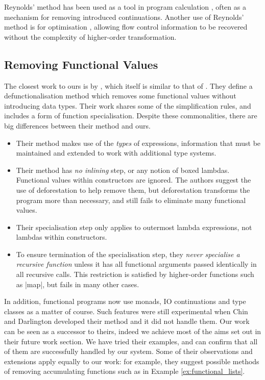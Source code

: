 \documentclass[preprint]{sigplanconf}
\begin{document}
Reynolds' method has been used as a tool in program calculation \cite{danvy:defunctionalization_at_work,hutton:calculating_an_exceptional_machine}, often as a mechanism for removing introduced continuations. Another use of Reynolds' method is for optimisation \cite{jhc}, allowing flow control information to be recovered without the complexity of higher-order transformation.

\subsection{Removing Functional Values}

The closest work to ours is by \citet{chin:higher_order_removal}, which itself is similar to that of \citet{nelan:firstification}. They define a defunctionalisation method which removes some functional values without introducing data types. Their work shares some of the simplification rules, and includes a form of function specialisation. Despite these commonalities, there are big differences between their method and ours.

\begin{itemize}
\item Their method makes use of the \textit{types} of expressions, information that must be maintained and extended to work with additional type systems.
\item Their method has \textit{no inlining} step, or any notion of boxed lambdas. Functional values within constructors are ignored. The authors suggest the use of deforestation \cite{wadler:deforestation} to help remove them, but deforestation transforms the program more than necessary, and still fails to eliminate many functional values.
\item Their specialisation step only applies to outermost lambda expressions, not lambdas within constructors.
\item To ensure termination of the specialisation step, they \textit{never specialise a recursive function} unless it has all functional arguments passed identically in all recursive calls. This restriction is satisfied by higher-order functions such as |map|, but fails in many other cases.
\end{itemize}

In addition, functional programs now use monads, IO continuations and type classes as a matter of course. Such features were still experimental when Chin and Darlington developed their method and it did not handle them. Our work can be seen as a successor to theirs, indeed we achieve most of the aims set out in their future work section. We have tried their examples, and can confirm that all of them are successfully handled by our system. Some of their observations and extensions apply equally to our work: for example, they suggest possible methods of removing accumulating functions such as in Example \ref{ex:functional_lists}.
\end{document}
